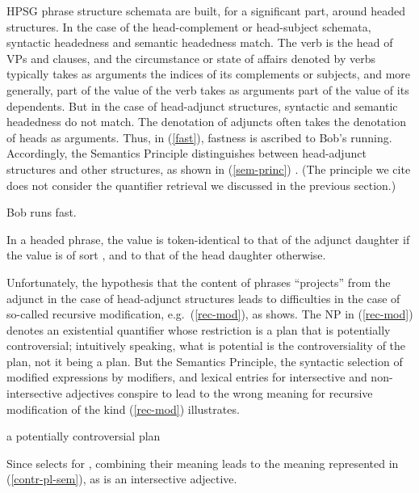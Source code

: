 \documentclass[output=paper]{langsci/langscibook}
\begin{document}
HPSG phrase structure schemata are  built, for a significant part, around headed structures. In the case of the head-complement or head-subject schemata, syntactic headedness and semantic headedness match. The verb is the head of VPs and clauses, and the circumstance or state of affairs denoted by verbs typically takes as arguments the indices of its complements or subjects, and more generally, part of the  value of the verb takes as arguments part of the  value of its dependents. But in the case of head-adjunct structures, syntactic and semantic headedness do not match. The denotation of adjuncts often takes the denotation of heads as arguments. Thus, in (\ref{fast}), fastness is ascribed to Bob's running. Accordingly, the Semantics Principle distinguishes between head-adjunct structures and other structures, as shown in (\ref{sem-princ}) \citep[56]{PollardandSag1994}. (The principle we cite does not consider the quantifier retrieval we discussed in the previous section.)

\begin{exe}
\ex\label{fast} Bob runs fast.
\end{exe} 

\begin{exe}
\ex\label{sem-princ}
In a headed phrase, the  value is token-identical to that of the adjunct daughter if the  value is of sort , and to that of the head daughter otherwise.
\end{exe}

Unfortunately, the hypothesis that the content of phrases ``projects'' from the adjunct in the case of head-adjunct structures leads to difficulties in the case of so-called recursive modification, e.g.\ (\ref{rec-mod}), as \citet{Kasper1997} shows. The NP in (\ref{rec-mod}) denotes an existential quantifier whose restriction is a plan that is potentially controversial; intuitively speaking, what is potential is the controversiality of the plan, not it being a plan. But the Semantics Principle, the syntactic selection of modified expressions by modifiers, and lexical entries for intersective and non-intersective adjectives conspire to lead to the wrong meaning for recursive modification of the kind (\ref{rec-mod}) illustrates.

\begin{exe}
\ex\label{rec-mod}a potentially controversial plan
\end{exe}

Since  selects for , combining their meaning leads to the meaning represented in (\ref{contr-pl-sem}), as  is an intersective adjective.
\end{document}
